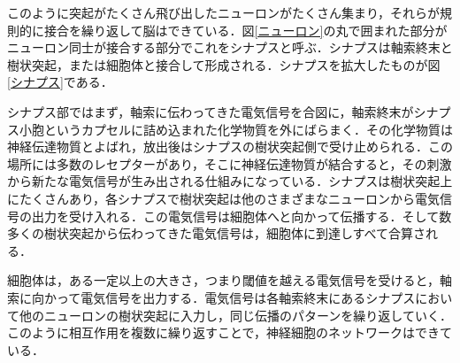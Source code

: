 \documentclass[a4paper,11pt]{jsreport}
\begin{document}
このように突起がたくさん飛び出したニューロンがたくさん集まり，それらが規則的に接合を繰り返して脳はできている．図\ref{ニューロン}の丸で囲まれた部分がニューロン同士が接合する部分でこれをシナプスと呼ぶ．シナプスは軸索終末と樹状突起，または細胞体と接合して形成される．シナプスを拡大したものが図\ref{シナプス}である．\par
シナプス部ではまず，軸索に伝わってきた電気信号を合図に，軸索終末がシナプス小胞というカプセルに詰め込まれた化学物質を外にばらまく．その化学物質は神経伝達物質とよばれ，放出後はシナプスの樹状突起側で受け止められる．この場所には多数のレセプターがあり，そこに神経伝達物質が結合すると，その刺激から新たな電気信号が生み出される仕組みになっている．シナプスは樹状突起上にたくさんあり，各シナプスで樹状突起は他のさまざまなニューロンから電気信号の出力を受け入れる．この電気信号は細胞体へと向かって伝播する．そして数多くの樹状突起から伝わってきた電気信号は，細胞体に到達しすべて合算される．\par
細胞体は，ある一定以上の大きさ，つまり閾値を越える電気信号を受けると，軸索に向かって電気信号を出力する．電気信号は各軸索終末にあるシナプスにおいて他のニューロンの樹状突起に入力し，同じ伝播のパターンを繰り返していく．このように相互作用を複数に繰り返すことで，神経細胞のネットワークはできている．
\end{document}
